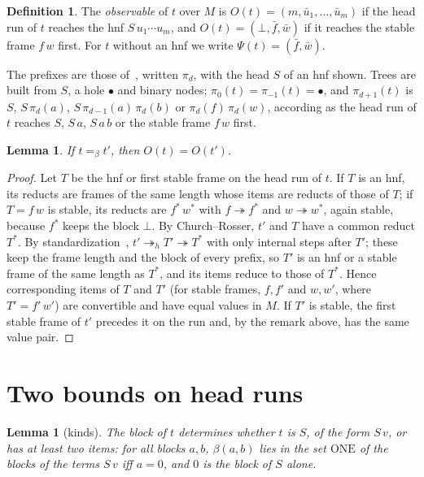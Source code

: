 \documentclass[11pt]{amsart}
\newtheorem{lemma}[theorem]{Lemma}
\theoremstyle{definition}
\newtheorem{definition}[theorem]{Definition}
\newcommand{\hole}{\bullet}
\newcommand{\hred}{\twoheadrightarrow_h}
\newcommand{\conv}{=_\beta}
\begin{document}
\begin{definition}\label{def:obs}
The \emph{observable} of $t$ over $M$ is $O(t)=(m,\bar u_1,\dots,\bar u_m)$ if the head run of $t$
reaches the hnf $S\,u_1\cdots u_m$, and $O(t)=(\bot,\bar f,\bar w)$ if it reaches the stable frame
$f\,w$ first. For $t$ without an hnf we write $\Psi(t)=(\bar f,\bar w)$.
\end{definition}

The prefixes are those of~\citep[Def.~2]{s5}, written $\pi_d$, with the head $S$ of an hnf shown.
Trees are built from $S$, a hole $\hole$ and binary nodes; $\pi_0(t)=\pi_{-1}(t)=\hole$, and
$\pi_{d+1}(t)$ is $S$, $S\,\pi_d(a)$, $S\,\pi_{d-1}(a)\,\pi_d(b)$ or $\pi_d(f)\,\pi_d(w)$, according as
the head run of $t$ reaches $S$, $S\,a$, $S\,a\,b$ or the stable frame $f\,w$ first.

\begin{lemma}\label{lem:invariant}
If $t\conv t'$, then $O(t)=O(t')$.
\end{lemma}

\begin{proof}
Let $T$ be the hnf or first stable frame on the head run of $t$. If $T$ is an hnf, its reducts are frames of the same length whose items are reducts of those of $T$;
if $T=f\,w$ is stable, its reducts are $f^*\,w^*$ with $f\twoheadrightarrow f^*$ and
$w\twoheadrightarrow w^*$, again stable, because $f^*$ keeps the block $\bot$. By Church--Rosser, $t'$ and $T$ have a common reduct $T^*$. By
standardization~\citep{terese}, $t'\hred T'\twoheadrightarrow T^*$ with only internal steps
after $T'$; these keep the frame length and the block of every prefix, so $T'$ is an hnf or a stable
frame of the same length as $T^*$, and its items reduce to those of $T^*$. Hence corresponding items of $T$ and $T'$ (for stable frames, $f,f'$ and $w,w'$, where
$T'=f'\,w'$) are convertible and have equal values in $M$. If $T'$ is stable, the first stable frame
of $t'$ precedes it on the run and, by the remark above, has the same value pair.
\end{proof}

\section{Two bounds on head runs}

\begin{lemma}[kinds]\label{lem:kinds}
The block of $t$ determines whether $t$ is $S$, of the form $S\,v$, or has at least two items:
for all blocks $a,b$, $\beta(a,b)$ lies in the set $\mathrm{ONE}$ of the blocks of the terms $S\,v$ iff $a=0$, and $0$ is the
block of $S$ alone.
\end{lemma}
\end{document}

